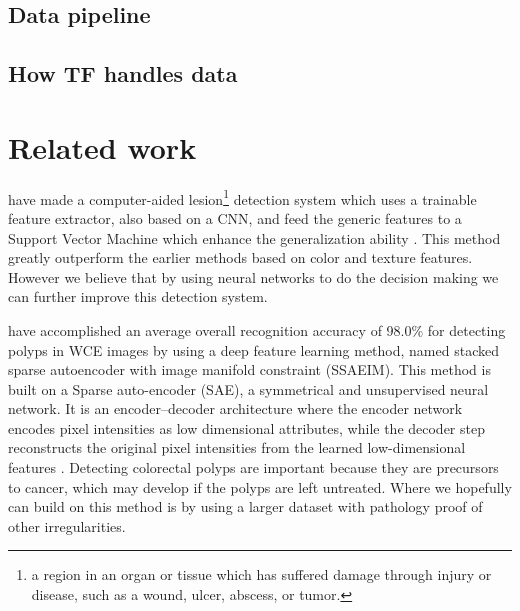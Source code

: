 \documentclass[thesis.tex]{subfiles}
\begin{document}
\subsection{Data pipeline} %


\subsection{How TF handles data}




\section{Related work} \label{relatedwork}
%
\citeauthor*{LesionDetection15} have made a computer-aided lesion\footnote{a region in an organ or tissue which has suffered damage through injury or disease, such as a wound, ulcer, abscess, or tumor.} detection system which uses a trainable feature extractor, also based on a CNN, and feed the generic features to a Support Vector Machine which enhance the generalization ability \cite{LesionDetection15}. This method greatly outperform the earlier methods based on color and texture features. However we believe that by using neural networks to do the decision making we can further improve this detection system. 

\medbreak 
\citeauthor*{DeepLearning17} have accomplished an average overall recognition accuracy of 98.0\% for detecting polyps in WCE images by using a deep feature learning method, named stacked sparse autoencoder with image manifold constraint (SSAEIM). This method is built on a Sparse auto-encoder (SAE), a symmetrical and unsupervised neural network. It is an encoder–decoder architecture where the encoder network encodes pixel intensities as low dimensional attributes, while the decoder step reconstructs the original pixel intensities from the learned low-dimensional features \cite{DeepLearning17}. Detecting colorectal polyps are important because they are precursors to cancer, which may develop if the polyps are left untreated. Where we hopefully can build on this method is by using a larger dataset with pathology proof of other irregularities.
\end{document}
